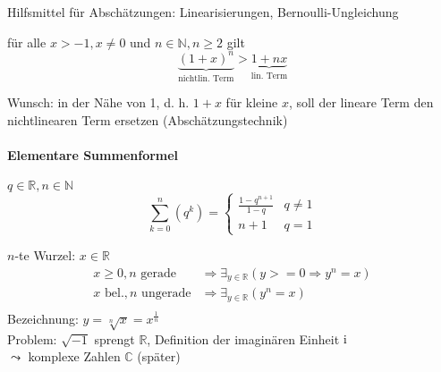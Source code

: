 \induction


Hilfsmittel für Abschätzungen: Linearisierungen, Bernoulli-Ungleichung

\begin{proposition}
  für alle $x > -1, x \neq 0$ und $n \in \mathbb{N}, n \geq 2$ gilt
  \begin{equation*} \underbrace{(1+x)^n}_\text{nichtlin. Term} > \underbrace{1+nx}_\text{lin. Term} \end{equation*}
\end{proposition}

\induction

Wunsch: in der Nähe von 1, d. h. $1+x$ für kleine $x$, soll der lineare Term den nichtlinearen Term ersetzen (Abschätzungstechnik)

\paragraph{Elementare Summenformel}

\begin{theorem}
 $q \in \mathbb{R}, n \in \mathbb{N}$
 \begin{equation*} \sum_{k=0}^n \left( q^k\right) = \begin{cases}\frac{1-q^{n+1}}{1-q} & q \neq 1 \\ n+1 & q = 1\end{cases} \end{equation*}
\end{theorem}

\induction

\begin{definition} $n$-te Wurzel:
 $x\in \mathbb{R}$
 \begin{align*}
  x \geq 0, n \text{ gerade} &\Rightarrow \exists_{y \in \mathbb{R}} \left( y >= 0 \Rightarrow y^n = x \right) \\
  x \text{ bel.}, n \text{ ungerade} &\Rightarrow \exists_{y \in \mathbb{R}} \left( y^n = x \right) \\
 \end{align*}
Bezeichnung: $y = \sqrt[n]{x} = x^\frac 1 n$\\
Problem: $\sqrt{-1}$ sprengt $\mathbb{R}$, Definition der imaginären Einheit $\operatorname{i}$\\$\leadsto$ komplexe Zahlen $\mathbb{C}$ (später)
\end{definition}

